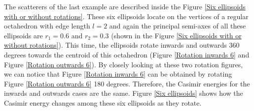   The scatterers of the last example are described inside the Figure \ref{Six ellipsoids with or without rotations}. These six ellipsoids locate on the 
  vertices of a regular octahedron with edge length $l = 2$ and again the principal semi-axes of all these ellipsoids are $r_{1} = 0.6$ and $r_{2} = 0.3$ (shown 
  in the Figure \ref{Six ellipsoids with or without rotations}). This time, the ellipsoids rotate inwards and outwards 360 degrees towards the centroid of 
  this octahedron (Figure \ref{Rotation inwards 6} and Figure \ref{Rotation outwards 6}). By closely looking at these two rotation figures, we can notice that 
  Figure \ref{Rotation inwards 6} can be obtained by rotating Figure \ref{Rotation outwards 6} 180 degrees. Therefore, the Casimir energies for the inwards and 
  outwards cases are the same. Figure \eqref{Six ellipsoids} shows how the Casimir energy changes among these six ellipsoids as they rotate. 

